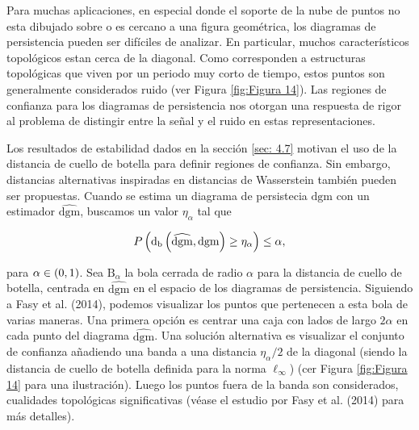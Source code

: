 Para muchas aplicaciones,
en especial donde el soporte de la nube de puntos no esta dibujado sobre o es cercano a una figura geom\'etrica,
los diagramas de persistencia pueden ser dif\'iciles de analizar.
En particular, muchos caracter\'isticos topol\'ogicos estan cerca de la diagonal.
Como corresponden  a estructuras topol\'ogicas que viven por un periodo muy corto de tiempo,
estos puntos son generalmente considerados ruido (ver Figura \ref{fig:Figura 14}).
Las regiones de confianza para los diagramas de persistencia nos otorgan una respuesta
de rigor al problema de distingir entre la se\~{n}al y el ruido en estas representaciones.

Los resultados de estabilidad dados en la secci\'on \ref{sec: 4.7}
motivan el uso de la distancia de cuello de botella para definir regiones de confianza.
Sin embargo, distancias alternativas inspiradas en distancias de Wasserstein tambi\'en pueden ser propuestas.
Cuando se estima un diagrama de persistecia $\mathrm{dgm}$ con un estimador $\widehat{\mathrm{dgm}}$,
buscamos un valor $\eta_{\alpha}$ tal que

\begin{equation*}
    P\left(\mathrm{d}_{\mathrm{b}}\left(\widehat{\mathrm{dgm}},\mathrm{dgm}\right)\geq\eta_{\alpha}\right)\leq\alpha,
\end{equation*}

para $\alpha\in\left(0,1\right)$. Sea $\mathrm{B}_{\alpha}$ la bola cerrada de radio $\alpha$
para la distancia de cuello de botella, centrada en $\widehat{\mathrm{dgm}}$ en el espacio
de los diagramas de persistencia. Siguiendo a Fasy et al. (2014)\cite{Fasy2014b},
podemos visualizar los puntos que pertenecen a esta bola de varias maneras.
Una primera opci\'on es centrar una caja con lados de largo $2\alpha$
en cada punto del diagrama $\widehat{\mathrm{dgm}}$.
Una soluci\'on alternativa es visualizar el conjunto de confianza
a\~{n}adiendo una banda a una distancia $\eta_{\alpha}/2$ de la diagonal
(siendo la distancia de cuello de botella definida para la norma $\ell_{\infty}$)
(cer Figura \ref{fig:Figura 14} para una ilustraci\'on).
Luego los puntos fuera de la banda son considerados, cualidades topol\'ogicas significativas
(v\'ease el estudio por Fasy et al. (2014)\cite{Fasy2014b} para m\'as detalles).

